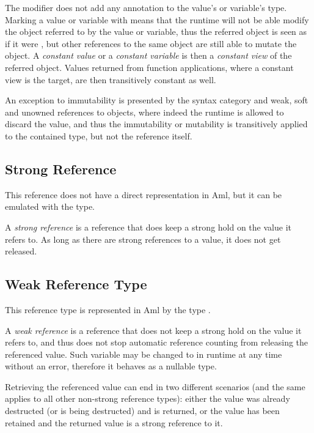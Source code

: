 The  modifier does not add any annotation to the value's or variable's type. Marking a value or variable with  means that the runtime will not be able modify the object referred to by the value or variable, thus the referred object is seen as if it were , but other references to the same object are still able to mutate the object. A {\em constant value} or a {\em constant variable} is then a {\em constant view} of the referred object. Values returned from function applications, where a constant view is the target, are then transitively constant as well. 

An exception to immutability is presented by the  syntax category and weak, soft and unowned references to objects, where indeed the runtime is allowed to discard the value, and thus the immutability or mutability is transitively applied to the contained type, but not the reference itself. 






\subsection{Strong Reference}

This reference does not have a direct representation in Aml, but it can be emulated with the  type. 

A {\em strong reference} is a reference that does keep a strong hold on the value it refers to. As long as there are strong references to a value, it does not get released. 






\subsection{Weak Reference Type}

This reference type is represented in Aml by the type . 

A {\em weak reference} is a reference that does not keep a strong hold on the value it refers to, and thus does not stop automatic reference counting from releasing the referenced value. Such variable may be changed to  in runtime at any time without an error, therefore it behaves as a nullable type. 

Retrieving the referenced value can end in two different scenarios (and the same applies to all other non-strong reference types): either the value was already destructed (or is being destructed) and  is returned, or the value has been retained and the returned value is a strong reference to it. 

